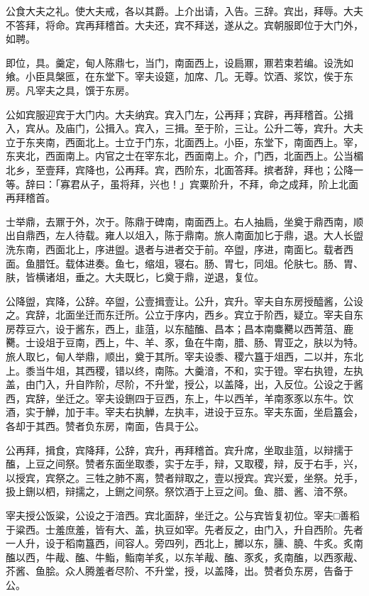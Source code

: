 \documentclass[]{article}
\begin{document}
公食大夫之礼。使大夫戒，各以其爵。上介出请，入告。三辞。宾出，拜辱。大夫不答拜，将命。宾再拜稽首。大夫还，宾不拜送，遂从之。宾朝服即位于大门外，如聘。

即位，具。羹定，甸人陈鼎七，当门，南面西上，设扃鼏，鼏若束若编。设洗如飨。小臣具槃匜，在东堂下。宰夫设筵，加席、几。无尊。饮酒、浆饮，俟于东房。凡宰夫之具，馔于东房。

公如宾服迎宾于大门内。大夫纳宾。宾入门左，公再拜；宾辟，再拜稽首。公揖入，宾从。及庙门，公揖入。宾入，三揖。至于阶，三让。公升二等，宾升。大夫立于东夹南，西面北上。士立于门东，北面西上。小臣，东堂下，南面西上。宰，东夹北，西面南上。内官之士在宰东北，西面南上。介，门西，北面西上。公当楣北乡，至壹拜，宾降也，公再拜。宾，西阶东，北面答拜。摈者辞，拜也；公降一等。辞曰：「寡君从子，虽将拜，兴也！」宾粟阶升，不拜，命之成拜，阶上北面再拜稽首。

士举鼎，去鼏于外，次于。陈鼎于碑南，南面西上。右人抽扃，坐奠于鼎西南，顺出自鼎西，左人待载。雍人以俎入，陈于鼎南。旅人南面加匕于鼎，退。大人长盥洗东南，西面北上，序进盥。退者与进者交于前。卒盥，序进，南面匕。载者西面。鱼腊饪。载体进奏。鱼七，缩俎，寝右。肠、胃七，同俎。伦肤七。肠、胃、肤，皆横诸俎，垂之。大夫既匕，匕奠于鼎，逆退，复位。

公降盥，宾降，公辞。卒盥，公壹揖壹让。公升，宾升。宰夫自东房授醯酱，公设之。宾辞，北面坐迁而东迁所。公立于序内，西乡。宾立于阶西，疑立。宰夫自东房荐豆六，设于酱东，西上，韭菹，以东醓醢、昌本；昌本南麋臡以西菁菹、鹿臡。士设俎于豆南，西上，牛、羊、豕，鱼在牛南，腊、肠、胃亚之，肤以为特。旅人取匕，甸人举鼎，顺出，奠于其所。宰夫设黍、稷六簋于俎西，二以并，东北上。黍当牛俎，其西稷，错以终，南陈。大羹湆，不和，实于镫。宰右执镫，左执盖，由门入，升自阼阶，尽阶，不升堂，授公，以盖降，出，入反位。公设之于酱西，宾辞，坐迁之。宰夫设鉶四于豆西，东上，牛以西羊，羊南豕豕以东牛。饮酒，实于觯，加于丰。宰夫右执觯，左执丰，进设于豆东。宰夫东面，坐启簋会，各却于其西。赞者负东房，南面，告具于公。

公再拜，揖食，宾降拜，公辞，宾升，再拜稽首。宾升席，坐取韭菹，以辩擩于醢，上豆之间祭。赞者东面坐取黍，实于左手，辩，又取稷，辩，反于右手，兴，以授宾，宾祭之。三牲之肺不离，赞者辩取之，壹以授宾。宾兴爱，坐祭。兑手，扱上鉶以柶，辩擩之，上鉶之间祭。祭饮酒于上豆之间。鱼、腊、酱、湆不祭。

宰夫授公饭粱，公设之于湆西。宾北面辞，坐迁之。公与宾皆复初位。宰夫□善稻于粱西。士羞庶羞，皆有大、盖，执豆如宰。先者反之，由门入，升自西阶。先者一人升，设于稻南簋西，间容人。旁四列，西北上，膷以东，臐、膮、牛炙。炙南醢以西，牛胾、醢、牛鮨，鮨南羊炙，以东羊胾、醢、豕炙，炙南醢，以西豕胾、芥酱、鱼脍。众人腾羞者尽阶、不升堂，授，以盖降，出。赞者负东房，告备于公。
\end{document}
